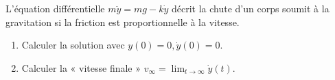 
\begin{exercice}\label{exoEqsDiff0013}

L'équation différentielle $m \ddot y = mg - k\dot y$ décrit la chute d'un corps soumit à la gravitation si la friction est proportionnelle à la vitesse.
\begin{enumerate}

\item
Calculer la solution avec $y(0) =0, \dot y(0) = 0$.
\item
Calculer la « vitesse finale »  $v_\infty = \displaystyle \lim_{t \to \infty} \dot y (t)$.

\end{enumerate}

\end{exercice}
